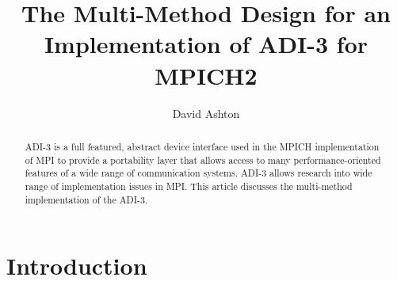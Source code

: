 \documentclass[dvipdfm,twoside,11pt]{article}
\begin{document}
%
\title{The Multi-Method Design for an Implementation of ADI-3 for MPICH2}
\author{David Ashton}
\maketitle

{}
\setcounter{page}{0}
\cleardoublepage
\pagestyle{plain}
\begingroup
\parskip=0pt
\tableofcontents
\bigskip
\endgroup
\bigskip

\clearpage

\setcounter{page}{1}

\begin{abstract}
ADI-3 is a full featured, abstract device interface used in the MPICH
implementation of MPI to provide a portability layer that allows
access to many performance-oriented features of a wide range of
communication systems.  ADI-3 allows research into wide range of
implementation issues in MPI.  This article discusses the multi-method
implementation of the ADI-3.
\end{abstract}

\section{Introduction}
\end{document}
